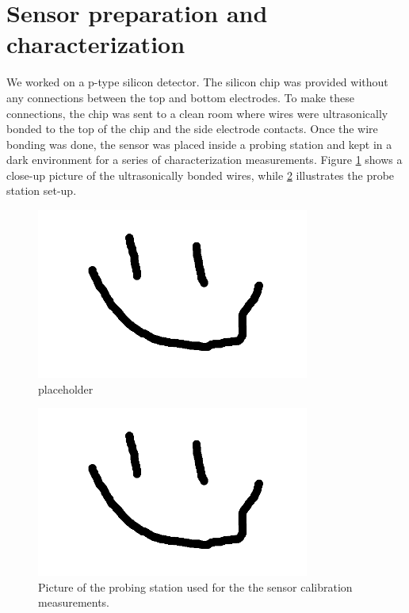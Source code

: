 \documentclass[12pt]{article}
\begin{document}
%
%

\section{Sensor preparation and characterization}

We worked on a p-type silicon detector. The silicon chip was provided without any connections between the top and bottom electrodes. To make these connections, the chip was sent to a clean room where wires were ultrasonically bonded to the top of the chip and the side electrode contacts. Once the wire bonding was done, the sensor was placed inside a probing station and kept in a dark environment for a series of characterization measurements. Figure \ref{fig:wirebond} shows a close-up picture of the ultrasonically bonded wires, while \ref{fig:probe_station} illustrates the probe station set-up.

\begin{figure}[h]
  \centering
  \includegraphics[width=0.8\textwidth]{./graphics/placeholder}
  \caption{placeholder}
  \label{fig:wirebond}
\end{figure}

\begin{figure}[h]
  \centering
  \includegraphics[width=0.8\textwidth]{./graphics/placeholder}
  \caption{Picture of the probing station used for the the sensor calibration measurements.}
  \label{fig:probe_station}
\end{figure}
\end{document}
